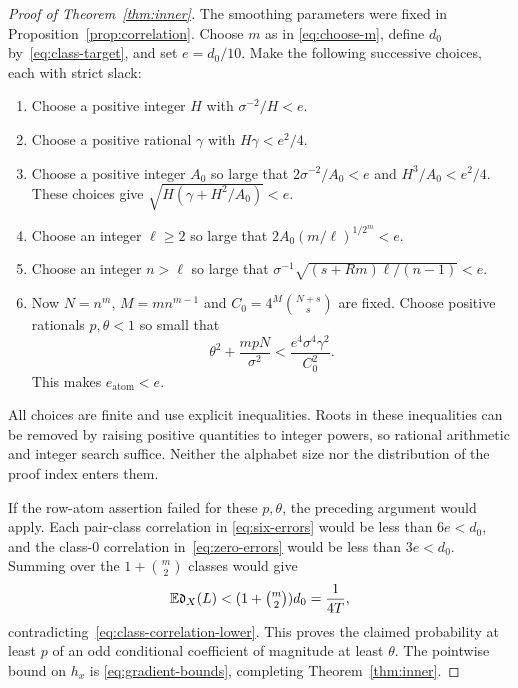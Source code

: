 \begin{proof}[Proof of Theorem~\ref{thm:inner}]
The smoothing parameters were fixed in
Proposition~\ref{prop:correlation}. Choose $m$ as in
\eqref{eq:choose-m}, define $d_0$ by~\eqref{eq:class-target}, and set
$e=d_0/10$. Make the following successive choices, each with strict
slack:
\begin{enumerate}[label=\arabic*.,leftmargin=*]
 \item Choose a positive integer $H$ with $\sigma^{-2}/H<e$.
 \item Choose a positive rational $\gamma$ with $H\gamma<e^2/4$.
 \item Choose a positive integer $A_0$ so large that
       $2\sigma^{-2}/A_0<e$ and $H^3/A_0<e^2/4$.
       These choices give
       $\sqrt{H(\gamma+H^2/A_0)}<e$.
 \item Choose an integer $\ell\ge2$ so large that
       $2A_0(m/\ell)^{1/2^m}<e$.
 \item Choose an integer $n>\ell$ so large that
       $\sigma^{-1}\sqrt{(s+Rm)\ell/(n-1)}<e$.
 \item Now $N=n^m$, $M=mn^{m-1}$ and
       $C_0=4^M\binom{N+s}{s}$ are fixed. Choose positive rationals
       $p,\theta<1$ so small that
       \[
        \theta^2+\frac{mpN}{\sigma^2}
        <\frac{e^4\sigma^4\gamma^2}{C_0^2}.
       \]
       This makes $e_{\mathrm{atom}}<e$.
\end{enumerate}
All choices are finite and use explicit inequalities. Roots in these
inequalities can be removed by raising positive quantities to integer
powers, so rational arithmetic and integer search suffice. Neither the
alphabet size nor the distribution of the proof index enters them.

If the row-atom assertion failed for these $p,\theta$, the preceding
argument would apply. Each pair-class correlation in
\eqref{eq:six-errors} would be less than $6e<d_0$, and the class-$0$
correlation in~\eqref{eq:zero-errors} would be less than $3e<d_0$.
Summing over the $1+\binom m2$ classes would give
\[
 \mathbb E\mathfrak d_X(L)<(1+\tbinom m2)d_0=\frac1{4T},
\]
contradicting~\eqref{eq:class-correlation-lower}. This proves the
claimed probability at least $p$ of an odd conditional coefficient
of magnitude at least $\theta$. The pointwise bound on $h_x$ is
\eqref{eq:gradient-bounds}, completing
Theorem~\ref{thm:inner}.
\end{proof}
